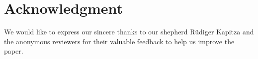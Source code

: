 \section*{Acknowledgment}

We would like to express our sincere thanks to our shepherd Rüdiger Kapitza and the anonymous reviewers for their valuable feedback to help us improve the paper.